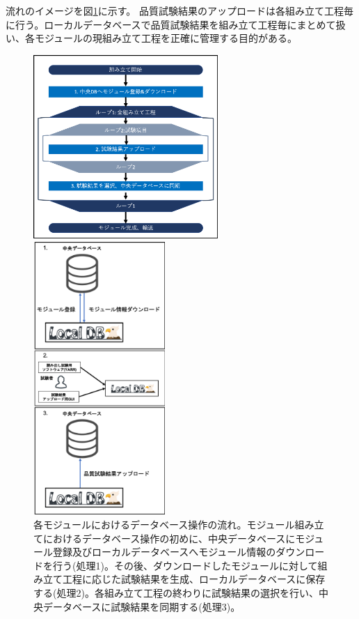 流れのイメージを図\ref{dbsystem_flow}に示す。
品質試験結果のアップロードは各組み立て工程毎に行う。ローカルデータベースで品質試験結果を組み立て工程毎にまとめて扱い、各モジュールの現組み立て工程を正確に管理する目的がある。
\begin{figure}[bpt]\centering
  \begin{minipage}{0.5\hsize}
    \includegraphics[width=7cm]{./dbsystem_flowchart.png}
  \end{minipage}
  \begin{minipage}{0.4\hsize}
    \includegraphics[width=5cm]{./dbsystem_flow_image.png}
  \end{minipage}
\caption[各モジュールにおけるデータベース操作の流れ]{各モジュールにおけるデータベース操作の流れ。モジュール組み立てにおけるデータベース操作の初めに、中央データベースにモジュール登録及びローカルデータベースへモジュール情報のダウンロードを行う(処理1)。その後、ダウンロードしたモジュールに対して組み立て工程に応じた試験結果を生成、ローカルデータベースに保存する(処理2)。各組み立て工程の終わりに試験結果の選択を行い、中央データベースに試験結果を同期する(処理3)。}
\label{dbsystem_flow}
\end{figure}

